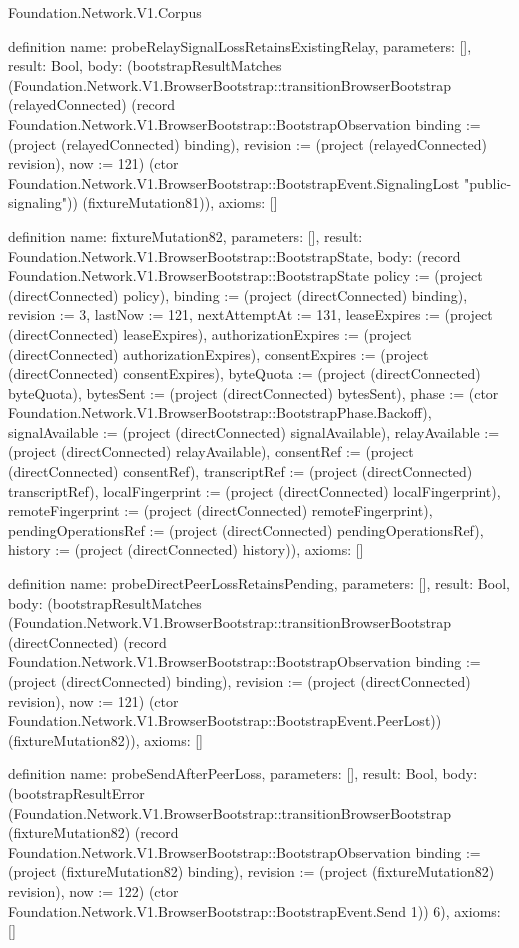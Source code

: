 \begin{lexlean}{Foundation.Network.V1.Corpus}
\begin{semanticmodule}
definition{
  name: probeRelaySignalLossRetainsExistingRelay,
  parameters: [],
  result: Bool,
  body: (bootstrapResultMatches (Foundation.Network.V1.BrowserBootstrap::transitionBrowserBootstrap (relayedConnected) (record Foundation.Network.V1.BrowserBootstrap::BootstrapObservation {binding := (project (relayedConnected) binding), revision := (project (relayedConnected) revision), now := 121}) (ctor Foundation.Network.V1.BrowserBootstrap::BootstrapEvent.SignalingLost "public-signaling")) (fixtureMutation81)),
  axioms: []
}

definition{
  name: fixtureMutation82,
  parameters: [],
  result: Foundation.Network.V1.BrowserBootstrap::BootstrapState,
  body: (record Foundation.Network.V1.BrowserBootstrap::BootstrapState {policy := (project (directConnected) policy), binding := (project (directConnected) binding), revision := 3, lastNow := 121, nextAttemptAt := 131, leaseExpires := (project (directConnected) leaseExpires), authorizationExpires := (project (directConnected) authorizationExpires), consentExpires := (project (directConnected) consentExpires), byteQuota := (project (directConnected) byteQuota), bytesSent := (project (directConnected) bytesSent), phase := (ctor Foundation.Network.V1.BrowserBootstrap::BootstrapPhase.Backoff), signalAvailable := (project (directConnected) signalAvailable), relayAvailable := (project (directConnected) relayAvailable), consentRef := (project (directConnected) consentRef), transcriptRef := (project (directConnected) transcriptRef), localFingerprint := (project (directConnected) localFingerprint), remoteFingerprint := (project (directConnected) remoteFingerprint), pendingOperationsRef := (project (directConnected) pendingOperationsRef), history := (project (directConnected) history)}),
  axioms: []
}

definition{
  name: probeDirectPeerLossRetainsPending,
  parameters: [],
  result: Bool,
  body: (bootstrapResultMatches (Foundation.Network.V1.BrowserBootstrap::transitionBrowserBootstrap (directConnected) (record Foundation.Network.V1.BrowserBootstrap::BootstrapObservation {binding := (project (directConnected) binding), revision := (project (directConnected) revision), now := 121}) (ctor Foundation.Network.V1.BrowserBootstrap::BootstrapEvent.PeerLost)) (fixtureMutation82)),
  axioms: []
}

definition{
  name: probeSendAfterPeerLoss,
  parameters: [],
  result: Bool,
  body: (bootstrapResultError (Foundation.Network.V1.BrowserBootstrap::transitionBrowserBootstrap (fixtureMutation82) (record Foundation.Network.V1.BrowserBootstrap::BootstrapObservation {binding := (project (fixtureMutation82) binding), revision := (project (fixtureMutation82) revision), now := 122}) (ctor Foundation.Network.V1.BrowserBootstrap::BootstrapEvent.Send 1)) 6),
  axioms: []
}


\end{semanticmodule}
\end{lexlean}
